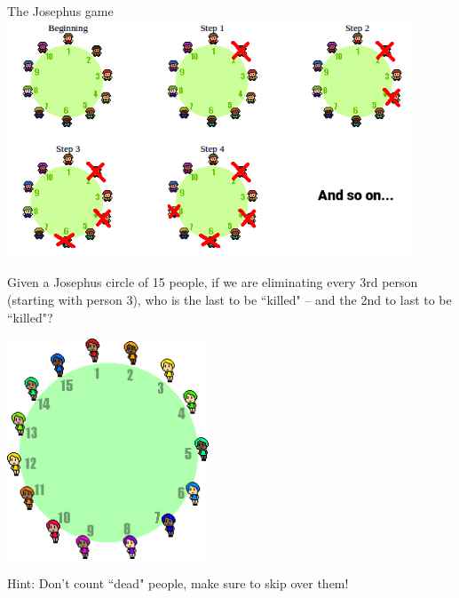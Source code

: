 \documentclass[a4paper,12pt]{book}
\newcounter{question}
\begin{document}
\begin{intro}{The Josephus game}
            \includegraphics[width=12cm]{images/josephus.png}
        \end{intro}

        \newpage{}
        
        \begin{questionNOGRADE}{\thequestion}
            Given a Josephus circle of 15 people,
            if we are eliminating every 3rd person (starting with person 3),
            who is the last to be ``killed" – and the 2nd to last to be ``killed"?

            \begin{center}
                \includegraphics[width=6cm]{images/josephus-15.png}
            \end{center}

            \begin{hint}{Hint:}
                Don't count ``dead" people, make sure to skip over them!
            \end{hint}
            
        \end{questionNOGRADE}
\end{document}
